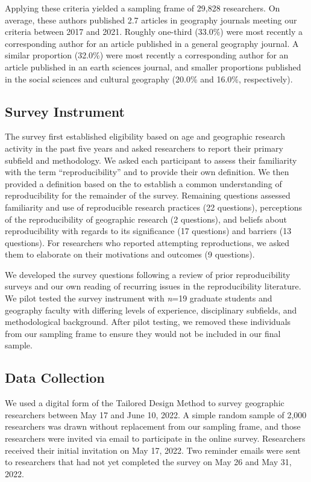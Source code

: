 \documentclass[]{interact}
\theoremstyle{plain}%
\theoremstyle{definition}
\theoremstyle{remark}
\begin{document}
Applying these criteria yielded a sampling frame of 29,828 researchers. 
On average, these authors published 2.7 articles in geography journals meeting our criteria between 2017 and 2021. 
Roughly one-third (33.0\%) were most recently a corresponding author for an article published in a general geography journal. 
A similar proportion (32.0\%) were most recently a corresponding author for an article published in an earth sciences journal, and smaller proportions published in the social sciences and cultural geography (20.0\% and 16.0\%, respectively).

\subsection*{Survey Instrument}
The survey first established eligibility based on age and geographic research activity in the past five years and asked researchers to report their primary subfield and methodology.
We asked each participant to assess their familiarity with the term ``reproducibility'' and to provide their own definition. 
We then provided a definition based on the \citet{NASEM2019} to establish a common understanding of reproducibility for the remainder of the survey.
Remaining questions assessed familiarity and use of reproducible research practices (22 questions), perceptions of the reproducibility of geographic research (2 questions), and beliefs about reproducibility with regards to its significance (17 questions) and barriers (13 questions).
For researchers who reported attempting reproductions, we asked them to elaborate on their motivations and outcomes (9 questions).

We developed the survey questions following a review of prior reproducibility surveys \citep[e.g.,][]{fanelli2009many,baker20161, konkol2019} and our own reading of recurring issues in the reproducibility literature. 
We pilot tested the survey instrument with \textit{n}=19 graduate students and geography faculty with differing levels of experience, disciplinary subfields, and methodological background. 
After pilot testing, we removed these individuals from our sampling frame to ensure they would not be included in our final sample.

\subsection*{Data Collection}
We used a digital form of the Tailored Design Method \citep{dillman2014internet} to survey geographic researchers between May 17 and June 10, 2022.
A simple random sample of 2,000 researchers was drawn without replacement from our sampling frame, and those researchers were invited via email to participate in the online survey. 
Researchers received their initial invitation on May 17, 2022. 
Two reminder emails were sent to researchers that had not yet completed the survey on May 26 and May 31, 2022.
\end{document}
